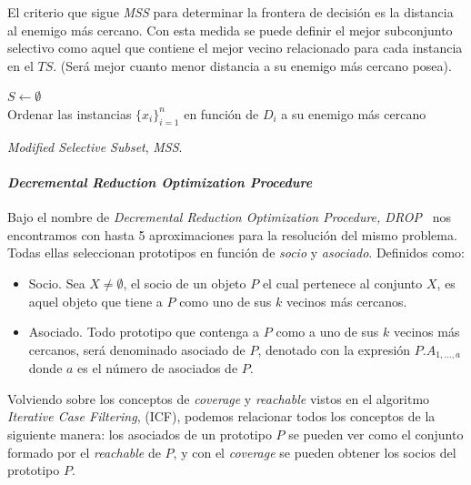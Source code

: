 El criterio que sigue \textit{MSS} para determinar la frontera de decisión es la distancia al enemigo más cercano. Con esta medida se puede definir el mejor subconjunto selectivo como aquel que contiene el mejor vecino relacionado para cada instancia en el $TS$. (Será mejor cuanto menor distancia a su enemigo más cercano posea).

\begin{algorithm}[H]
  	\BlankLine
  $S \leftarrow \emptyset$\\  	
  Ordenar las instancias $\lbrace x_i \rbrace^{n}_{i=1}$ en función de $D_i$ a su enemigo más cercano\\
	\caption{\textit{Modified Selective Subset}, \textit{MSS}.}\label{alg:Barandela-MSS}
\end{algorithm}

\paragraph{\textit{Decremental Reduction Optimization Procedure}}\label{paragraph:DROP}
\hfill \break
Bajo el nombre de \textit{Decremental Reduction Optimization Procedure, DROP}~\cite{wilson2000reduction} nos encontramos con hasta 5 aproximaciones para la resolución del mismo problema. Todas ellas seleccionan prototipos en función de \textit{socio} y \textit{asociado}. Definidos como:
\begin{itemize}
\item Socio. Sea $X \not= \emptyset$, el socio de un objeto $P$ el cual pertenece al conjunto $X$, es aquel objeto que tiene a $P$ como uno de sus $k$ vecinos más cercanos.
\item Asociado. Todo prototipo que contenga a $P$ como a uno de sus $k$ vecinos más cercanos, será denominado asociado de $P$, denotado con la expresión $P.A_{1,\dots,a}$ donde $a$ es el número de asociados de $P$.
\end{itemize}

Volviendo sobre los conceptos de \textit{coverage} y \textit{reachable} vistos en el algoritmo \textit{Iterative Case Filtering}, (ICF), podemos relacionar todos los conceptos de la siguiente manera: los asociados de un prototipo $P$ se pueden ver como el conjunto formado por el \textit{reachable} de $P$, y con el \textit{coverage} se pueden obtener los socios del prototipo $P$.

